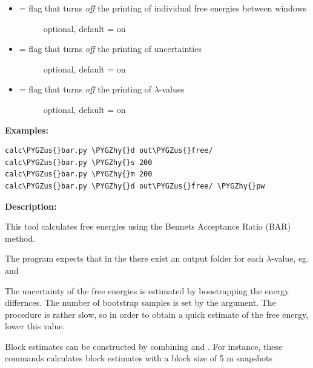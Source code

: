\documentclass[letterpaper,10pt,english]{sphinxmanual}
\def\PYGZus{\char`\_}
\def\PYGZhy{\char`\-}
\begin{document}
\begin{itemize}
\begin{description}
\end{description}

\item {} \begin{description}
\item[{  = flag that turns \emph{off} the printing of individual free energies between windows}] \leavevmode
optional, default = on

\end{description}

\item {} \begin{description}
\item[{  = flag that turns \emph{off} the printing of uncertainties}] \leavevmode
optional, default = on

\end{description}

\item {} \begin{description}
\item[{  = flag that turns \emph{off} the printing of \(\lambda\)-values}] \leavevmode
optional, default = on

\end{description}

\end{itemize}

\textbf{Examples:}

\begin{Verbatim}[commandchars=\\\{\}]
calc\PYGZus{}bar.py \PYGZhy{}d out\PYGZus{}free/
calc\PYGZus{}bar.py \PYGZhy{}s 200
calc\PYGZus{}bar.py \PYGZhy{}m 200
calc\PYGZus{}bar.py \PYGZhy{}d out\PYGZus{}free/ \PYGZhy{}pw
\end{Verbatim}

\textbf{Description:}

This tool calculates free energies using the Bennets Acceptance Ratio (BAR) method.

The program expects that in the  there exist an output folder for each \(\lambda\)-value, eg.  and 

The uncertainty of the free energies is estimated by boostrapping the energy differnces. The number of bootstrap samples is set by the  argument. The procedure is rather slow, so in order to obtain a quick estimate of the free energy, lower this value.

Block estimates can be constructed by combining  and . For instance, these commands calculates block estimates with a block size of 5 m snapshots
\end{document}
